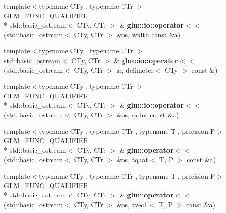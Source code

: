 \begin{DoxyCompactItemize}
\item 
\hypertarget{namespaceglm_1_1io_ac4783e4e3b0384619625d5d2d00c27b8}{{\footnotesize template$<$typename C\-Ty , typename C\-Tr $>$ }\\G\-L\-M\-\_\-\-F\-U\-N\-C\-\_\-\-Q\-U\-A\-L\-I\-F\-I\-E\-R \\*
std\-::basic\-\_\-ostream$<$ C\-Ty, C\-Tr $>$ \& {\bfseries glm\-::io\-::operator$<$$<$} (std\-::basic\-\_\-ostream$<$ C\-Ty, C\-Tr $>$ \&os, width const \&a)}\label{namespaceglm_1_1io_ac4783e4e3b0384619625d5d2d00c27b8}

\item 
\hypertarget{namespaceglm_1_1io_a721b0bde3ed5f7d7b11a1d90d22a8ad3}{{\footnotesize template$<$typename C\-Ty , typename C\-Tr $>$ }\\std\-::basic\-\_\-ostream$<$ C\-Ty, C\-Tr $>$ \& {\bfseries glm\-::io\-::operator$<$$<$} (std\-::basic\-\_\-ostream$<$ C\-Ty, C\-Tr $>$ \&, delimeter$<$ C\-Ty $>$ const \&)}\label{namespaceglm_1_1io_a721b0bde3ed5f7d7b11a1d90d22a8ad3}

\item 
\hypertarget{namespaceglm_1_1io_a4dab7c825ecbd918643ed9fc9ef4ecb6}{{\footnotesize template$<$typename C\-Ty , typename C\-Tr $>$ }\\G\-L\-M\-\_\-\-F\-U\-N\-C\-\_\-\-Q\-U\-A\-L\-I\-F\-I\-E\-R \\*
std\-::basic\-\_\-ostream$<$ C\-Ty, C\-Tr $>$ \& {\bfseries glm\-::io\-::operator$<$$<$} (std\-::basic\-\_\-ostream$<$ C\-Ty, C\-Tr $>$ \&os, order const \&a)}\label{namespaceglm_1_1io_a4dab7c825ecbd918643ed9fc9ef4ecb6}

\item 
\hypertarget{group__gtx__io_ga038d37e8d7965dc7bfae5dc23e4140af}{{\footnotesize template$<$typename C\-Ty , typename C\-Tr , typename T , precision P$>$ }\\G\-L\-M\-\_\-\-F\-U\-N\-C\-\_\-\-Q\-U\-A\-L\-I\-F\-I\-E\-R \\*
std\-::basic\-\_\-ostream$<$ C\-Ty, C\-Tr $>$ \& {\bfseries glm\-::operator$<$$<$} (std\-::basic\-\_\-ostream$<$ C\-Ty, C\-Tr $>$ \&os, tquat$<$ T, P $>$ const \&a)}\label{group__gtx__io_ga038d37e8d7965dc7bfae5dc23e4140af}

\item 
\hypertarget{group__gtx__io_ga171289d1671b75e033a1b078c68a7460}{{\footnotesize template$<$typename C\-Ty , typename C\-Tr , typename T , precision P$>$ }\\G\-L\-M\-\_\-\-F\-U\-N\-C\-\_\-\-Q\-U\-A\-L\-I\-F\-I\-E\-R \\*
std\-::basic\-\_\-ostream$<$ C\-Ty, C\-Tr $>$ \& {\bfseries glm\-::operator$<$$<$} (std\-::basic\-\_\-ostream$<$ C\-Ty, C\-Tr $>$ \&os, tvec1$<$ T, P $>$ const \&a)}\label{group__gtx__io_ga171289d1671b75e033a1b078c68a7460}


\end{DoxyCompactItemize}
